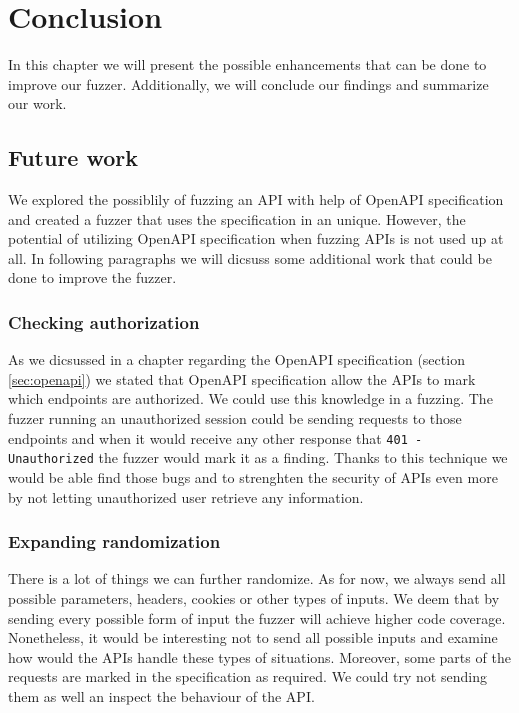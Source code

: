 \chapter{Conclusion}
In this chapter we will present the possible enhancements that can be done to improve our fuzzer. Additionally, we will conclude our findings and summarize our work.

\section{Future work}
We explored the possiblily of fuzzing an API with help of OpenAPI specification and created a fuzzer that uses the specification in an unique. However, the potential of utilizing OpenAPI specification when fuzzing APIs is not used up at all. In following paragraphs we will dicsuss some additional work that could be done to improve the fuzzer.

\subsection{Checking authorization}
As we dicsussed in a chapter regarding the OpenAPI specification (section \ref{sec:openapi}) we stated that OpenAPI specification allow the APIs to mark which endpoints are authorized. We could use this knowledge in a fuzzing. The fuzzer running an unauthorized session could be sending requests to those endpoints and when it would receive any other response that \texttt{401 - Unauthorized} the fuzzer would mark it as a finding. Thanks to this technique we would be able find those bugs and to strenghten the security of APIs even more by not letting unauthorized user retrieve any information.

\subsection{Expanding randomization}
There is a lot of things we can further randomize. As for now, we always send all possible parameters, headers, cookies or other types of inputs. We deem that by sending every possible form of input the fuzzer will achieve higher code coverage. Nonetheless, it would be interesting not to send all possible inputs and examine how would the APIs handle these types of situations. Moreover, some parts of the requests are marked in the specification as required. We could try not sending them as well an inspect the behaviour of the API.


